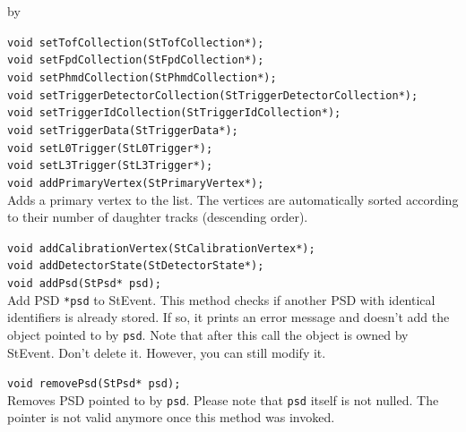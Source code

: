 \documentclass[twoside]{article}
\newcommand{\entrylabel}[1]{\mbox{\textbf{{#1}}}\hfil}%
\newenvironment{entry}
{\begin{list}{}%
    {\renewcommand{\makelabel}{\entrylabel}%
     \setlength{\labelwidth}{90pt}%
     \setlength{\leftmargin}{\labelwidth}
     \advance\leftmargin by \labelsep%
      }%
    }%
  {\end{list}}
\newcommand{\Entrylabel}[1]%
{\raisebox{0pt}[1ex][0pt]{\makebox[\labelwidth][l]%
    {\parbox[t]{\labelwidth}{\hspace{0pt}\textbf{{#1}}}}}}
\newenvironment{Entry}%
{\renewcommand{\entrylabel}{\Entrylabel}\begin{entry}}%
  {\end{entry}}
\begin{document}
\begin{Entry}
    \verb+void setTofCollection(StTofCollection*);+\\

    \verb+void setFpdCollection(StFpdCollection*);+\\

    \verb+void setPhmdCollection(StPhmdCollection*);+\\

    \verb+void setTriggerDetectorCollection(StTriggerDetectorCollection*);+\\

    \verb+void setTriggerIdCollection(StTriggerIdCollection*);+\\

    \verb+void setTriggerData(StTriggerData*);+\\

    \verb+void setL0Trigger(StL0Trigger*);+\\
    
    \verb+void setL3Trigger(StL3Trigger*);+\\
    
    \verb+void addPrimaryVertex(StPrimaryVertex*);+\\
    Adds a primary vertex to the list. The vertices are
    automatically sorted according to their number of daughter
    tracks (descending order). 

    \verb+void addCalibrationVertex(StCalibrationVertex*);+\\

    \verb+void addDetectorState(StDetectorState*);+\\
    
    \verb+void addPsd(StPsd* psd);+\\
    Add PSD \texttt{*psd} to StEvent. This method checks if another
    PSD with identical identifiers is already stored. If so, it prints
    an error message and doesn't add the object pointed to by
    \texttt{psd}. Note that after this call the object is owned by StEvent.
    Don't delete it. However, you can still modify it.
    
    \verb+void removePsd(StPsd* psd);+\\
    Removes PSD pointed to by \texttt{psd}. Please note that \texttt{psd}
    itself is not nulled. The pointer is not valid anymore once this method
    was invoked.
    
\end{Entry}
\clearpage
\end{document}
